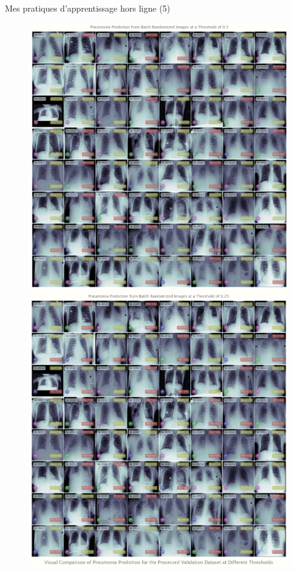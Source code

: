 \documentclass{beamer}
\begin{document}
	\begin{frame}[fragile]{Mes pratiques d'apprentissage hors ligne (5)}
		\begin{figure}[!htb]
			\vspace{-.25em}
			\centering\includegraphics[width=\linewidth]{images/deep_learning_5_1_1.png}
			\endminipage\hfill
			\centering\includegraphics[width=\linewidth]{images/deep_learning_5_1_2.png}

\end{figure}
\end{frame}
\end{document}
